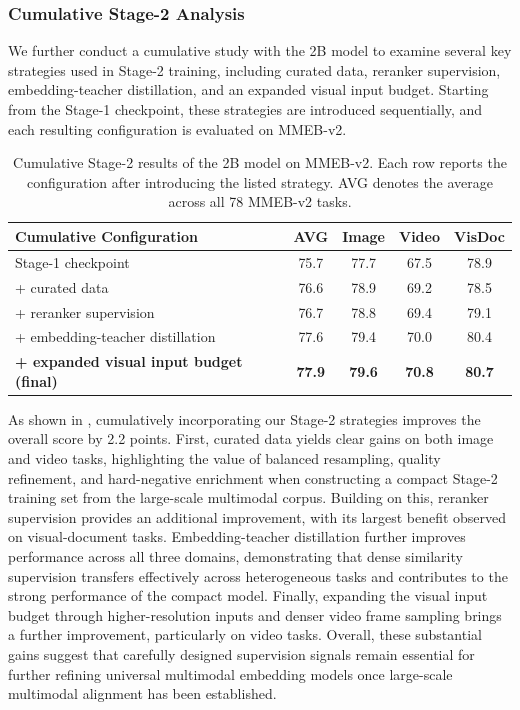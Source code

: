 \documentclass[]{wechat}
\begin{document}
\subsubsection{Cumulative Stage-2 Analysis}
\label{subsec:stage2_ablation}

We further conduct a cumulative study with the 2B model to examine several key strategies used in Stage-2 training, including curated data, reranker supervision, embedding-teacher distillation, and an expanded visual input budget. Starting from the Stage-1 checkpoint, these strategies are introduced sequentially, and each resulting configuration is evaluated on MMEB-v2.

\begin{table}[htbp]
\centering
\small
\setlength{\tabcolsep}{5.5pt}
\renewcommand{\arraystretch}{1.06}
\begin{tabular}{lcccc}
\toprule
\textbf{Cumulative Configuration} & \textbf{AVG} & \textbf{Image} & \textbf{Video} & \textbf{VisDoc} \\
\midrule
Stage-1 checkpoint & 75.7 & 77.7 & 67.5 & 78.9 \\
\quad + curated data & 76.6 & 78.9 & 69.2 & 78.5 \\
\quad + reranker supervision & 76.7 & 78.8 & 69.4 & 79.1 \\
\quad + embedding-teacher distillation & 77.6 & 79.4 & 70.0 & 80.4 \\
\rowcolor{gray!10}\quad \textbf{+ expanded visual input budget (final)} & \textbf{77.9} & \textbf{79.6} & \textbf{70.8} & \textbf{80.7} \\
\bottomrule
\end{tabular}
\caption{Cumulative Stage-2 results of the 2B model on MMEB-v2. Each row reports the configuration after introducing the listed strategy. AVG denotes the average across all 78 MMEB-v2 tasks.}
\label{tab:stage2_ablation}
\end{table}

As shown in , cumulatively incorporating our Stage-2 strategies improves the overall score by 2.2 points. First, curated data yields clear gains on both image and video tasks, highlighting the value of balanced resampling, quality refinement, and hard-negative enrichment when constructing a compact Stage-2 training set from the large-scale multimodal corpus. Building on this, reranker supervision provides an additional improvement, with its largest benefit observed on visual-document tasks. Embedding-teacher distillation further improves performance across all three domains, demonstrating that dense similarity supervision transfers effectively across heterogeneous tasks and contributes to the strong performance of the compact model. Finally, expanding the visual input budget through higher-resolution inputs and denser video frame sampling brings a further improvement, particularly on video tasks. Overall, these substantial gains suggest that carefully designed supervision signals remain essential for further refining universal multimodal embedding models once large-scale multimodal alignment has been established.
\end{document}
